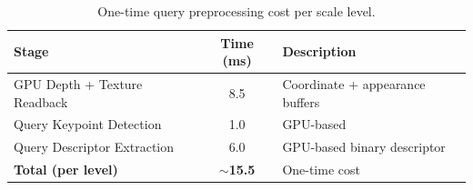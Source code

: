 \begin{table}[htbp]
\centering
\caption{One-time query preprocessing cost per scale level.}
\label{tab:query_runtime}
\begin{tabular}{lcl}
\toprule
\textbf{Stage} & \textbf{Time (ms)} & \textbf{Description} \\
\midrule
GPU Depth + Texture Readback    & 8.5 & Coordinate + appearance buffers \\
Query Keypoint Detection        & 1.0 & GPU-based \\
Query Descriptor Extraction     & 6.0 & GPU-based binary descriptor \\
\midrule
\textbf{Total (per level)}      & \textbf{$\sim$15.5} & One-time cost \\
\bottomrule
\end{tabular}
\end{table}
